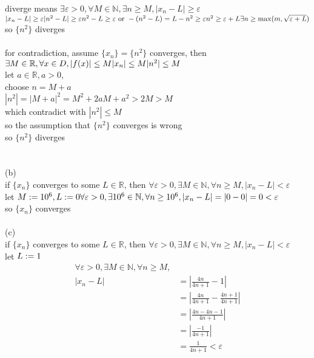 \documentclass[12pt, border = 4pt, multi]{article} %
\begin{document}
diverge means $\exists \varepsilon > 0, \forall M \in \mathbb{N}, \exists n \geq M, |x_n - L| \geq \varepsilon$\\
$|x_n - L| \geq \varepsilon\\
|n ^ 2 - L| \geq \varepsilon\\
n ^ 2 - L \geq \varepsilon \text{ or } -(n ^ 2 - L) = L - n ^ 2 \geq \varepsilon\\
n ^ 2 \geq \varepsilon + L\\
\exists n \geq \max(m, \sqrt{\varepsilon + L})\\$
so $\{n ^ 2\}$ diverges\\
\\
for contradiction, assume $\{x_n\} = \{n ^ 2\}$ converges, then $\exists M \in \mathbb{R}, \forall x \in D, |f(x)| \leq M\\
|x_n| \leq M\\
|n ^ 2| \leq M$\\
let $a \in \mathbb{R}, a > 0$,\\
choose $n = M + a$\\
$|n ^ 2| = |M + a| ^ 2 = M ^ 2 + 2aM + a ^ 2 > 2M > M$\\
which contradict with $|n ^ 2| \leq M$\\
so the assumption that $\{n ^ 2\}$ converges is wrong\\
so $\{n ^ 2\}$ diverges\\
\\
\\
(b)\\
if $\{x_n\}$ converges to some $L \in \mathbb{R}$, then $\forall \varepsilon > 0, \exists M \in \mathbb{N}, \forall n \geq M, |x_n - L| < \varepsilon$\\
let $M := 10 ^ 6,\\
L := 0\\
\forall \varepsilon > 0, \exists 10 ^ 6 \in \mathbb{N}, \forall n \geq 10 ^ 6, |x_n - L| = |0 - 0| = 0 < \varepsilon$\\
so $\{x_n\}$ converges\\
\\
\newpage
\noindent
(c)\\
if $\{x_n\}$ converges to some $L \in \mathbb{R}$, then $\forall \varepsilon > 0, \exists M \in \mathbb{N}, \forall n \geq M, |x_n - L| < \varepsilon$\\
let $L := 1\\$
\begin{align*}
\forall \varepsilon > 0, \exists M \in \mathbb{N}, \forall n \geq M,&\\
|x_n - L| &= \left|\frac{4n}{4n + 1} - 1\right|\\
&= \left|\frac{4n}{4n + 1} - \frac{4n + 1}{4n + 1}\right|\\
&= \left|\frac{4n - 4n - 1}{4n + 1}\right|\\
&= \left|\frac{-1}{4n + 1}\right|\\
&= \frac{1}{4n + 1} < \varepsilon
\end{align*}
\end{document}
